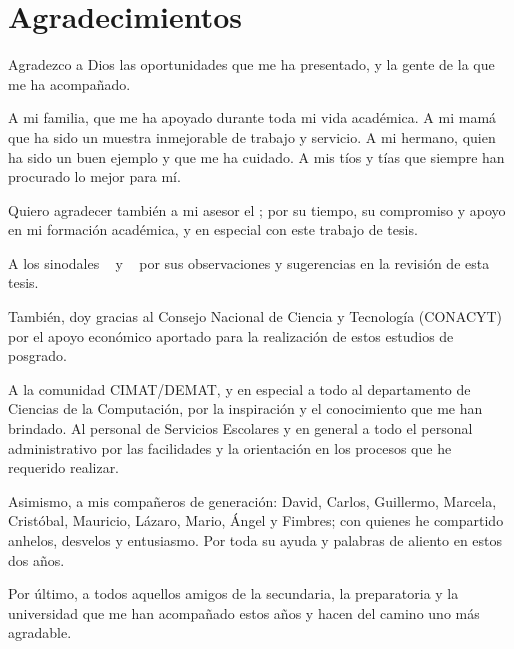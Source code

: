 
\begingroup
\let\clearpage\relax
\let\cleardoublepage\relax
\let\cleardoublepage\relax
\chapter*{Agradecimientos}

Agradezco a Dios las oportunidades que me ha presentado, y la gente de la que me ha acompañado.

A mi familia, que me ha apoyado durante toda mi vida académica. A mi mamá que ha sido un muestra inmejorable de trabajo y servicio. A mi hermano, quien ha sido un buen ejemplo y que me ha cuidado. A mis tíos y tías que siempre han procurado lo mejor para mí.

Quiero agradecer también a mi asesor el \myProf; por su tiempo, su compromiso y apoyo en mi formación académica, y en especial con este trabajo de tesis. 

A los sinodales \myFstSuperv~ y \mySndSuperv~ por sus observaciones y sugerencias en la revisión de esta tesis.

También, doy gracias al Consejo Nacional de Ciencia y Tecnología (CONACYT) por el apoyo económico aportado para la realización de estos estudios de posgrado.

A la comunidad CIMAT/DEMAT, y en especial a todo al departamento de Ciencias de la Computación, por la inspiración y el conocimiento que me han brindado. Al personal de Servicios Escolares y en general a todo el personal administrativo por las facilidades y la orientación en los procesos que he requerido realizar.

Asimismo, a mis compañeros de generación: David, Carlos, Guillermo, Marcela, Cristóbal, Mauricio, Lázaro, Mario, Ángel y Fimbres; con quienes he compartido anhelos, desvelos y entusiasmo. Por toda su ayuda y palabras de aliento en estos dos años.

Por último, a todos aquellos amigos de la secundaria, la preparatoria y la universidad que me han acompañado estos años y hacen del camino uno más agradable.

\endgroup
